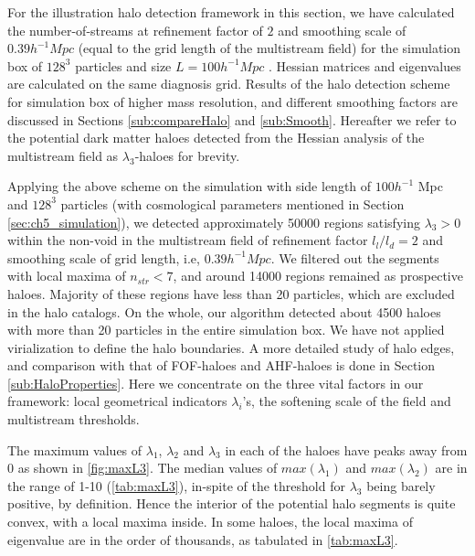 {For the illustration halo detection framework in this section, we have calculated the number-of-streams at refinement factor of $2$ and smoothing scale of $0.39 h^{-1} Mpc$ (equal to the grid length of the multistream field) for the simulation box of $128^3$ particles and size $L = 100 h^{-1} Mpc$ . Hessian matrices and eigenvalues are calculated on the same diagnosis grid. Results of the halo detection scheme for simulation box of higher mass resolution, and different smoothing factors are discussed in Sections \ref{sub:compareHalo} and \ref{sub:Smooth}. Hereafter we refer to the potential dark matter haloes detected from the Hessian analysis of the multistream field as $\lambda_3$-haloes for brevity. 
 

Applying the above scheme on the simulation with side length of $100 h^{-1}$ Mpc and $128^3$ particles (with cosmological parameters mentioned in Section \ref{sec:ch5_simulation}), we detected approximately 50000 regions satisfying $\lambda_3 > 0$ within the non-void in the multistream field of refinement factor $l_l/l_d = 2$ and smoothing scale of grid length, i.e, $0.39 h^{-1} Mpc$. We filtered out the segments with local maxima of $n_{str} < 7$, and around 14000 regions remained as prospective haloes. Majority of these regions have less than 20 particles, which are excluded in the halo catalogs. On the whole, our algorithm detected about 4500 haloes with more than 20 particles in the entire simulation box. We have not applied virialization to define the halo boundaries. A more detailed study of halo edges, and comparison with that of FOF-haloes and AHF-haloes is done in Section \ref{sub:HaloProperties}. Here we concentrate on the three vital factors in our framework: local geometrical indicators $\lambda_i$'s, the softening scale of the field and multistream thresholds.

The maximum values of $\lambda_1$, $\lambda_2$ and $\lambda_3$ in each of the haloes have peaks away from 0 as shown in \autoref{fig:maxL3}. The median values of $max(\lambda_1)$ and $max(\lambda_2)$ are in the range of 1-10 (\autoref{tab:maxL3}), in-spite of the threshold for $\lambda_3$ being barely positive, by definition. Hence the interior of the potential halo segments is quite convex, with a local maxima inside. In some haloes, the local maxima of eigenvalue are in the order of thousands, as tabulated in \autoref{tab:maxL3}. 


}
